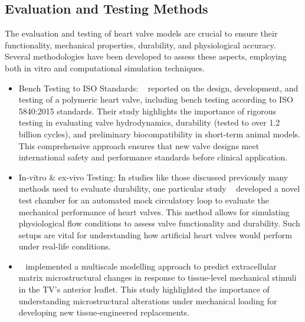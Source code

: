 \subsection{Evaluation and Testing Methods}
The evaluation and testing of heart valve models are crucial to ensure their functionality, mechanical properties, durability, and physiological accuracy. Several methodologies have been developed to assess these aspects, employing both in vitro and computational simulation techniques.

\begin{itemize}
    \item Bench
          Testing to ISO Standards: ~ reported on the design, development, and testing of a polymeric heart valve, including bench testing according to ISO 5840:2015 standards. Their study highlights the importance of rigorous testing in evaluating valve hydrodynamics, durability (tested to over 1.2 billion cycles), and preliminary biocompatibility in short-term animal models. This comprehensive approach ensures that new valve designs meet international safety and performance standards before clinical application.

    \item In-vitro \& ex-vivo Testing: In studies like those discussed previously many methods used to evaluate durability, one particular study ~  developed a novel test chamber for an automated mock circulatory loop to evaluate the mechanical performance of heart valves. This method allows for simulating physiological flow conditions to assess valve functionality and durability. Such setups are vital for understanding how artificial heart valves would perform under real-life conditions.
    \item ~ implemented a multiscale modelling approach to predict extracellular matrix microstructural changes in response to tissue-level mechanical stimuli in the \gls{TV}'s anterior leaflet. This study highlighted the importance of understanding microstructural alterations under mechanical loading for developing new tissue-engineered replacements.
\end{itemize}

